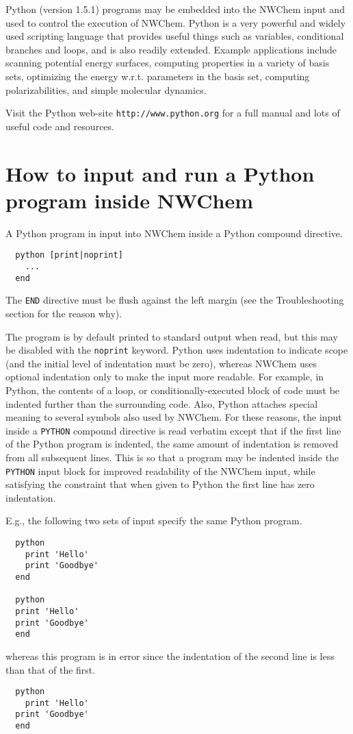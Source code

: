\label{sec:python}

Python (version 1.5.1) programs may be embedded into the NWChem input
and used to control the execution of NWChem.  Python is a very
powerful and widely used scripting language that provides useful
things such as variables, conditional branches and loops, and is also
readily extended.  Example applications include scanning potential
energy surfaces, computing properties in a variety of basis sets,
optimizing the energy w.r.t. parameters in the basis set, computing
polarizabilities, and simple molecular dynamics.

Visit the Python web-site \verb+http://www.python.org+ for a full manual
and lots of useful code and resources.  

\section{How to input and run a Python program inside NWChem}

A Python program in input into NWChem inside a Python compound directive.
\begin{verbatim}
  python [print|noprint]
    ...
  end
\end{verbatim}
The \verb+END+ directive must be flush against the left
margin (see the Troubleshooting section for the reason why).

The program is by default printed to standard output when read, but
this may be disabled with the \verb+noprint+ keyword.  Python uses
indentation to indicate scope (and the initial level of indentation
must be zero), whereas NWChem uses optional indentation only to make
the input more readable.  For example, in Python, the contents of a
loop, or conditionally-executed block of code must be indented further
than the surrounding code.  Also, Python attaches special meaning to
several symbols also used by NWChem.  For these reasons, the input
inside a \verb+PYTHON+ compound directive is read verbatim except that
if the first line of the Python program is indented, the same amount
of indentation is removed from all subsequent lines.  This is so that
a program may be indented inside the \verb+PYTHON+ input block for
improved readability of the NWChem input, while satisfying the
constraint that when given to Python the first line has zero
indentation.

E.g., the following two sets of input specify the same Python program.
\begin{verbatim}
  python
    print 'Hello'
    print 'Goodbye'
  end

  python
  print 'Hello'
  print 'Goodbye'
  end
\end{verbatim}
whereas this program is in error since the indentation of the second
line is less than that of the first.
\begin{verbatim}
  python
    print 'Hello'
  print 'Goodbye'
  end
\end{verbatim}

